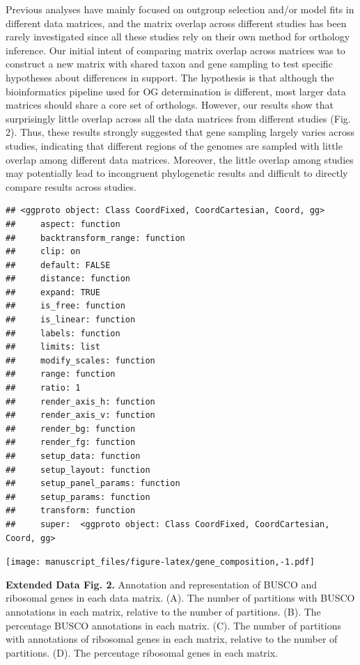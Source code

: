 \documentclass[]{article}
\begin{document}
Previous analyses have mainly focused on outgroup selection and/or model
fits in different data matrices, and the matrix overlap across different
studies has been rarely investigated since all these studies rely on
their own method for orthology inference. Our initial intent of
comparing matrix overlap across matrices was to construct a new matrix
with shared taxon and gene sampling to test specific hypotheses about
differences in support. The hypothesis is that although the
bioinformatics pipeline used for OG determination is different, most
larger data matrices should share a core set of orthologs. However, our
results show that surprisingly little overlap across all the data
matrices from different studies (Fig. 2). Thus, these results strongly
suggested that gene sampling largely varies across studies, indicating
that different regions of the genomes are sampled with little overlap
among different data matrices. Moreover, the little overlap among
studies may potentially lead to incongruent phylogenetic results and
difficult to directly compare results across studies.

\begin{verbatim}
## <ggproto object: Class CoordFixed, CoordCartesian, Coord, gg>
##     aspect: function
##     backtransform_range: function
##     clip: on
##     default: FALSE
##     distance: function
##     expand: TRUE
##     is_free: function
##     is_linear: function
##     labels: function
##     limits: list
##     modify_scales: function
##     range: function
##     ratio: 1
##     render_axis_h: function
##     render_axis_v: function
##     render_bg: function
##     render_fg: function
##     setup_data: function
##     setup_layout: function
##     setup_panel_params: function
##     setup_params: function
##     transform: function
##     super:  <ggproto object: Class CoordFixed, CoordCartesian, Coord, gg>
\end{verbatim}

\texttt{[image: manuscript\_files/figure-latex/gene\_composition,-1.pdf]}

\textbf{Extended Data Fig. 2.} Annotation and representation of BUSCO
and ribosomal genes in each data matrix. (A). The number of partitions
with BUSCO annotations in each matrix, relative to the number of
partitions. (B). The percentage BUSCO annotations in each matrix. (C).
The number of partitions with annotations of ribosomal genes in each
matrix, relative to the number of partitions. (D). The percentage
ribosomal genes in each matrix.
\end{document}
